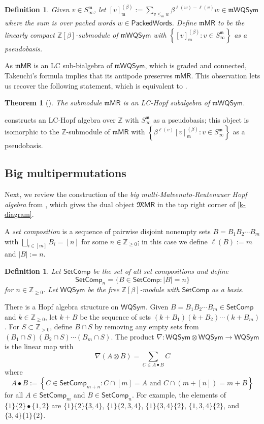 \documentclass[11pt]{article}
\newtheorem{definition}[theo]{Definition}
\newtheorem{theorem}[theo]{Theorem}
\theoremstyle{definition}
\numberwithin{equation}{section}
\numberwithin{equation}{section}
\newcommand{\ZZ}{\mathbb{Z}}
\newcommand{\fk}{\mathfrak}
\newcommand{\MMPR}{\mathfrak{M}\mathsf{MR}}
\newcommand{\mMPR}{\mathfrak{m}\mathsf{MR}}
\newcommand{\PWords}{\mathsf{PackedWords}}
\newcommand{\SetComp}{\mathsf{SetComp}}
\newcommand{\mWQSym}{\m\mathsf{WQSym}}
\newcommand{\MWQSym}{\mathsf{WQSym}}
\newcommand{\Sm}{S^{\fk m}}
\newcommand{\m}{\mathfrak{m}}
\newcommand{\PP}{\ZZ_{>0}}
\newcommand{\NN}{\ZZ_{\geq 0}}
\newcommand{\defn}[1]{{\color{darkred}\emph{#1}}}
\begin{document}
\begin{definition}
Given  $v \in \Sm_\infty$, let 
$ [v]^{(\beta)}_\m := \sum_{ v \leq_\m w} \beta^{\ell(w)-\ell(v)} w \in \mWQSym$
where the sum is over packed words $w \in \PWords$.
Define $\mMPR$ to be the 
linearly compact $\ZZ[\beta]$-submodule of $\mWQSym$ with  $\left\{[v]^{(\beta)}_\m : v \in \Sm_\infty\right\}$ as a pseudobasis.
\end{definition}



As $\mMPR$ is an LC sub-bialgebra of $\mWQSym$,
which is graded and connected, Takeuchi's formula \cite[Prop.~1.4.22]{GrinbergReiner} implies that its antipode preserves $\mMPR$. This observation lets us
recover the following statement, which is equivalent to \cite[Thms.~4.2 and 7.12]{LamPyl}. 

\begin{theorem}[{\cite{LamPyl}}]
\label{mmpr-thm}
The submodule $\mMPR$ is an LC-Hopf subalgebra of $\mWQSym$.
\end{theorem}



\cite[Thm.~4.2]{LamPyl}
constructs an LC-Hopf algebra over $\ZZ$ with $\Sm_\infty$ as a pseudobasis;
this object is isomorphic to the $\ZZ$-submodule of $\mMPR$ 
with $\left\{\beta^{\ell(v)} [v]^{(\beta)}_\m : v \in \Sm_\infty\right\}$ as a pseudobasis.


 
\subsection{Big multipermutations}

Next, we review the construction of the  \defn{big multi-Malvenuto-Reutenauer Hopf algebra}
from \cite{LamPyl},
which gives the dual object $\MMPR$ in the top right corner of \eqref{k-diagram}.

A \defn{set composition} 
is a sequence of pairwise disjoint nonempty sets $B=B_1B_2\cdots B_m$
with $\bigsqcup_{i \in[m]} B_i = [n]$ for some $n \in \NN$;
in this case we define
 $\ell(B) := m$ and 
 $|B| := n$.

\begin{definition}
Let $\SetComp$ be the set of all set compositions
and define \[\SetComp_n = \{ B \in \SetComp : |B| = n\}\] for $n \in \NN$.
Let $\MWQSym$ be the free $\ZZ[\beta]$-module with $\SetComp$ as a basis.
\end{definition}
%
There is a Hopf algebra structure on $\MWQSym$. 
Given $B=B_1B_2\cdots B_m \in \SetComp$ and $k \in \NN$,
let $k + B $ be the sequence of sets $(k+B_1)(k+B_2)\cdots (k+B_m)$.
For $S \subset \PP$,
define $B \cap S$ 
by removing any empty sets from $(B_1\cap S)(B_2\cap S)\cdots (B_m\cap S)$.
The product $\nabla : \MWQSym \otimes \MWQSym \to \MWQSym$
is the linear map with \[\nabla(A\otimes B) = 
\sum
_{C \in A\bullet B} 
C\]
where
\[A\bullet B := \left\{ C \in \SetComp_{m+n} : C \cap [m] = A\text{ and }C \cap (m+[n]) = m + B\right\}\]
for all $A \in \SetComp_m$ and $B \in \SetComp_n$.
For example,
the elements of $ \{1\}\{2\} \bullet \{1,2\}$ are
$\{1\}\{2\}\{3,4\}$,
$\{1\}\{2,3,4\}$,
$\{1\}\{3,4\}\{2\}$,
$\{1,3,4\}\{2\}$,
and
$\{3,4\}\{1\}\{2\}$.
\end{document}
